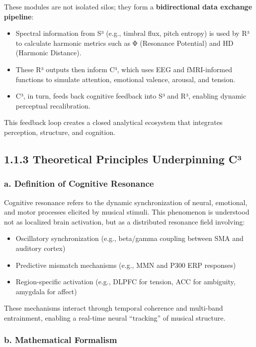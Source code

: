 \documentclass[10pt]{article}
\begin{document}
These modules are not isolated silos; they form a \textbf{bidirectional data exchange pipeline}:

\begin{itemize}
    \item Spectral information from S³ (e.g., timbral flux, pitch entropy) is used by R³ to calculate harmonic metrics such as Φ (Resonance Potential) and HD (Harmonic Distance).
    \item These R³ outputs then inform C³, which uses EEG and fMRI-informed functions to simulate attention, emotional valence, arousal, and tension.
    \item C³, in turn, feeds back cognitive feedback into S³ and R³, enabling dynamic perceptual recalibration.
\end{itemize}

This feedback loop creates a closed analytical ecosystem that integrates perception, structure, and cognition.

\subsection*{1.1.3 Theoretical Principles Underpinning C³}

\subsubsection*{a. Definition of Cognitive Resonance}

Cognitive resonance refers to the dynamic synchronization of neural, emotional, and motor processes elicited by musical stimuli. This phenomenon is understood not as localized brain activation, but as a distributed resonance field involving:

\begin{itemize}
    \item Oscillatory synchronization (e.g., beta/gamma coupling between SMA and auditory cortex)
    \item Predictive mismatch mechanisms (e.g., MMN and P300 ERP responses)
    \item Region-specific activation (e.g., DLPFC for tension, ACC for ambiguity, amygdala for affect)
\end{itemize}

These mechanisms interact through temporal coherence and multi-band entrainment, enabling a real-time neural “tracking” of musical structure.

\subsubsection*{b. Mathematical Formalism}
\end{document}
